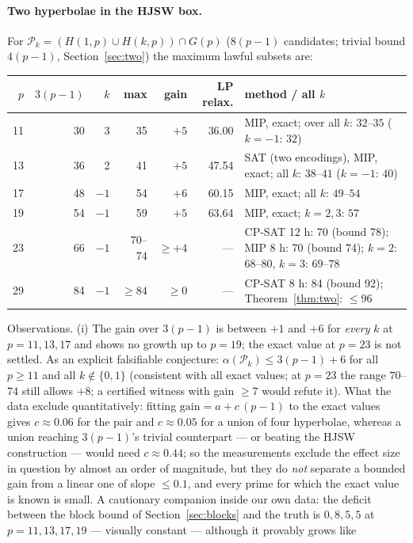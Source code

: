 \documentclass[11pt]{article}
\theoremstyle{remark}
\newcommand{\Gp}{G(p)}
\newcommand{\Pset}{\mathcal{P}}
\begin{document}
\paragraph{Two hyperbolae in the HJSW box.}  For $\Pset_k=(H(1,p)\cup H(k,p))\cap\Gp$ ($8(p-1)$ candidates; trivial bound $4(p-1)$,
Section~\ref{sec:two}) the maximum lawful subsets are:
\begin{center}\footnotesize
\begin{tabular}{rrrrrrp{6.6cm}}
\toprule
$p$ & $3(p-1)$ & $k$ & max & gain & LP relax. & method / all $k$\\
\midrule
11 & 30 & 3 & 35 & $+5$ & 36.00 & MIP, exact; over all $k$: $32$--$35$ ($k=-1$: $32$)\\
13 & 36 & 2 & 41 & $+5$ & 47.54 & SAT (two encodings), MIP, exact; all $k$: $38$--$41$ ($k=-1$: $40$)\\
17 & 48 & $-1$ & 54 & $+6$ & 60.15 & MIP, exact; all $k$: $49$--$54$\\
19 & 54 & $-1$ & 59 & $+5$ & 63.64 & MIP, exact; $k=2,3$: $57$\\
23 & 66 & $-1$ & $70$--$74$ & $\ge+4$ & --- & CP-SAT 12 h: 70 (bound 78); MIP 8 h: 70 (bound 74); $k=2$: $68$--$80$, $k=3$: $69$--$78$\\
29 & 84 & $-1$ & $\ge84$ & $\ge0$ & --- & CP-SAT 8 h: 84 (bound 92); Theorem~\ref{thm:two}: $\le96$\\
\bottomrule
\end{tabular}
\end{center}
Observations.  (i) The gain over $3(p-1)$ is between $+1$ and $+6$ for \emph{every} $k$ at $p=11,13,17$ and shows no growth up to
$p=19$; the exact value at $p=23$ is not settled.  As an explicit falsifiable conjecture: $\alpha(\Pset_k)\le3(p-1)+6$ for all $p\ge11$
and all $k\notin\{0,1\}$ (consistent with all exact values; at $p=23$ the range $70$--$74$ still allows $+8$; a certified witness with
gain $\ge7$ would refute it).  What the data exclude quantitatively: fitting $\text{gain}=a+c\,(p-1)$ to the exact values gives
$c\approx0.06$ for the pair and $c\approx0.05$ for a union of four hyperbolae, whereas a union reaching $3(p-1)$'s trivial
counterpart --- or beating the HJSW construction --- would need $c\approx0.44$; so the measurements exclude the effect size in question by
almost an order of magnitude, but they do \emph{not} separate a bounded gain from a linear one of slope $\le0.1$, and every prime for which
the exact value is known is small.  A cautionary companion inside our own data: the deficit between the block bound of
Section~\ref{sec:blocks} and the truth is $0,8,5,5$ at $p=11,13,17,19$ --- visually constant --- although it provably grows like
\end{document}
